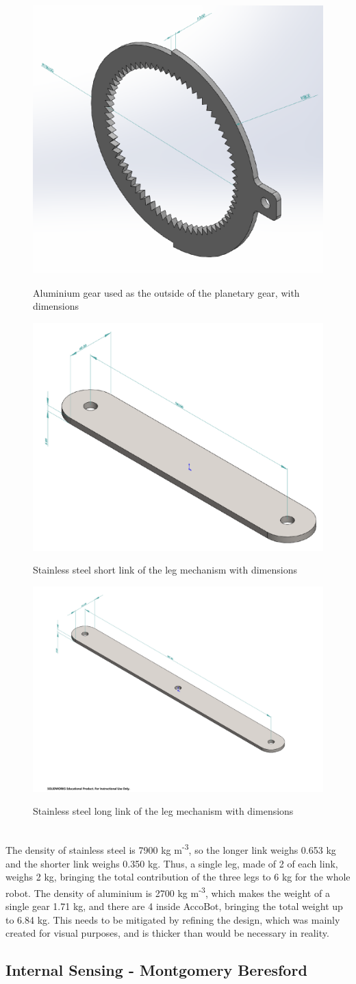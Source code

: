 \documentclass[11pt]{article}		%
\newcommand{\supercite}[1]{\textsuperscript{\cite{#1}}}		%
\begin{document}
				\begin{figure}[h]
					\centering
					\begin{multicols}{3}
						\includegraphics[height=0.18\textwidth]{gearCAD}
						\caption{Aluminium gear used as the outside of the planetary gear, with dimensions}
						\label{gearCAD}
						\columnbreak
						\includegraphics[height=0.18\textwidth]{shortLinkCAD}
						\caption{Stainless steel short link of the leg mechanism with dimensions}
						\label{shortLinkCAD}
						\columnbreak
						\includegraphics[height=0.18\textwidth]{longLinkCAD}
						\caption{Stainless steel long link of the leg mechanism with dimensions}
						\label{longLinkCAD}
					\end{multicols}
				\end{figure}
				\\
                \hspace*{3ex}The density of stainless steel is 7900 kg m\textsuperscript{-3}\supercite{HLT}, so the longer link weighs 0.653 kg and the shorter link weighs 0.350 kg.
				Thus, a single leg, made of 2 of each link, weighs 2 kg, bringing the total contribution of the three legs to 6 kg for the whole robot.
				The density of aluminium is 2700 kg m\textsuperscript{-3}\supercite{HLT}, which makes the weight of a single gear 1.71 kg, and there are 4 inside AccoBot, bringing the total weight up to 6.84 kg.
				This needs to be mitigated by refining the design, which was mainly created for visual purposes, and is thicker than would be necessary in reality.
			
		\subsection[Internal Sensing]{Internal Sensing - Montgomery Beresford}
		
\end{document}
